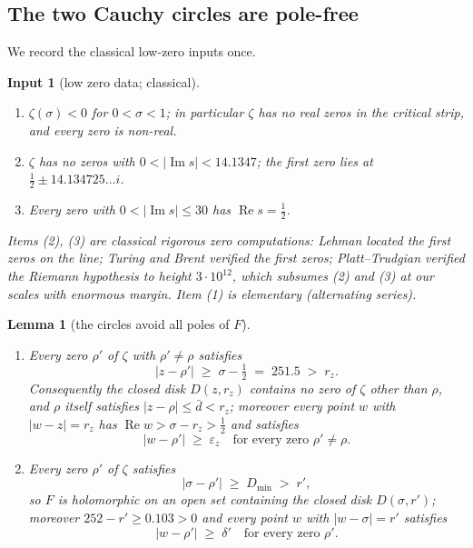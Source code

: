 \documentclass[11pt]{amsart}
\newtheorem{lemma}[theorem]{Lemma}
\newtheorem{assumption}[theorem]{Input}
\numberwithin{equation}{section}
\newcommand{\re}{\operatorname{Re}}
\newcommand{\im}{\operatorname{Im}}
\newcommand{\Sig}{\sigma}
\newcommand{\dbar}{\bar{d}}
\begin{document}
\subsection{The two Cauchy circles are pole-free}

We record the classical low-zero inputs once.

\begin{assumption}[low zero data; classical]\label{lem:zlow}\
\begin{enumerate}
\item $\zeta(\sigma) < 0$ for $0 < \sigma < 1$; in particular $\zeta$ has
no real zeros in the critical strip, and every zero is non-real.
\item $\zeta$ has no zeros with $0 < |\im s| < 14.1347$; the first zero
lies at $\tfrac12 \pm 14.134725\ldots i$.
\item Every zero with $0 < |\im s| \le 30$ has $\re s = \tfrac12$.
\end{enumerate}
Items (2), (3) are classical rigorous zero computations: Lehman
\cite{Leh66} located the first zeros on the line; Turing \cite{Tur53}
and Brent \cite{Bre79} verified the first zeros; Platt--Trudgian
\cite{PT21} verified the Riemann hypothesis to height $3\cdot 10^{12}$,
which subsumes (2) and (3) at our scales with enormous margin. Item (1)
is elementary (alternating series).
\end{assumption}

\begin{lemma}[the circles avoid all poles of $F$]\label{lem:circles}\
\begin{enumerate}
\item Every zero $\rho'$ of $\zeta$ with $\rho' \ne \rho$ satisfies
\[
|z - \rho'| \;\ge\; \Sig - \tfrac12 \;=\; 251.5 \;>\; r_z.
\]
Consequently the closed disk $D(z, r_z)$ contains no zero of $\zeta$
other than $\rho$, and $\rho$ itself satisfies
$|z - \rho| \le \dbar < r_z$; moreover every point $w$ with
$|w - z| = r_z$ has $\re w > \Sig - r_z > \tfrac12$ and satisfies
\[
|w - \rho'| \;\ge\; \varepsilon_z
\quad\text{for every zero } \rho' \ne \rho.
\]
\item Every zero $\rho'$ of $\zeta$ satisfies
\[
|\Sig - \rho'| \;\ge\; D_{\min} \;>\; r',
\]
so $F$ is holomorphic on an open set containing the closed disk
$D(\Sig, r')$; moreover $252 - r' \ge 0.103 > 0$ and every point $w$ with
$|w - \Sig| = r'$ satisfies
\[
|w - \rho'| \;\ge\; \delta'
\quad\text{for every zero } \rho'.
\]
\end{enumerate}
\end{lemma}
\end{document}
